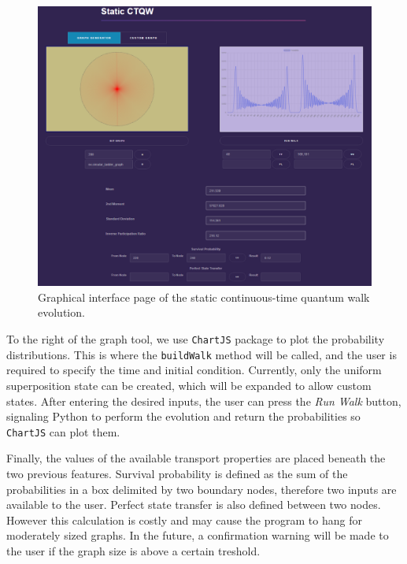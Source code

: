 \documentclass[../../dissertation.tex]{subfiles}
\begin{document}
\begin{figure}[!h]
  \centering
  \includegraphics[scale=0.4]{img/QWAK/qwakGuiStaticQW.png}
  \caption{Graphical interface page of the static continuous-time quantum walk evolution.}
  \label{fig:guiStaticPage}
\end{figure}

To the right of the graph tool, we use \texttt{ChartJS} package to plot the
probability distributions. This is where the \texttt{buildWalk} method will be
called, and the user is required to specify the time and initial
condition. Currently, only the uniform superposition state can be created,
which will be expanded to allow custom states. After entering the desired
inputs, the user can press the \textit{Run Walk} button, signaling Python to
perform the evolution and return the probabilities so \texttt{ChartJS} can plot
them.\par 

Finally, the values of the available transport properties are placed beneath
the two previous features. Survival probability is defined as the sum of the
probabilities in a box delimited by two boundary nodes, therefore two inputs
are available to the user. Perfect state transfer is also defined between two
nodes. However this calculation is costly and may cause the program to
hang for moderately sized graphs. In the future, a confirmation warning will be
made to the user if the graph size is above a certain treshold.\par
\end{document}
